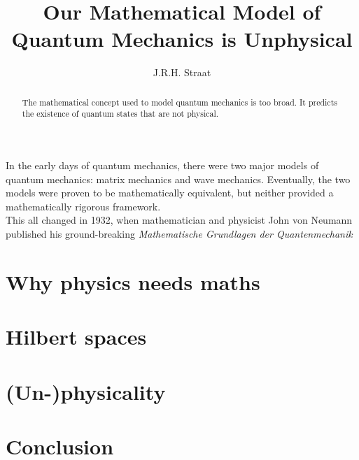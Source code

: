 \documentclass[12pt]{article}
\title{Our Mathematical Model of Quantum Mechanics is Unphysical}      %
\author{J.R.H. Straat}
\date{}
\begin{document}
\maketitle
%
\begin{abstract}
	The mathematical concept used to model quantum mechanics is too broad. It predicts the existence of quantum states that are not physical.
\end{abstract}
%
\begin{multicols}{2}
    In the early days of quantum mechanics, there were two major models of quantum mechanics: matrix mechanics and wave mechanics. Eventually, the two models were proven to be mathematically equivalent, but neither provided a mathematically rigorous framework.\\
    This all changed in 1932, when mathematician and physicist John von Neumann published his ground-breaking \textit{Mathematische Grundlagen der Quantenmechanik}
    \section{Why physics needs maths}
    \section{Hilbert spaces}
    \section{(Un-)physicality}
    \section{Conclusion}
\end{multicols}
\end{document}
